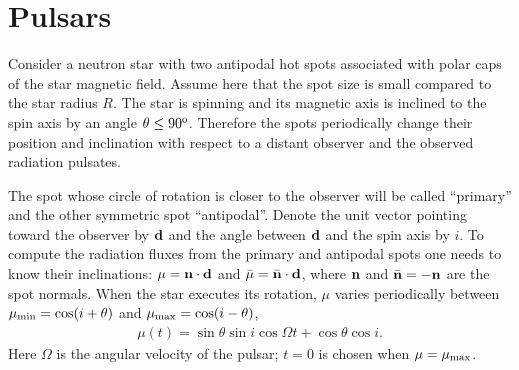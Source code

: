 \documentclass{article}
\def\om{{\it\bf a}}
\def\ob{{\it\bf d}}
\def\nn{{\it\bf n}}
\def\mumin{\mu_{\rm min}}
\def\mumax{\mu_{\rm max}}
\begin{document}
\newpage



\section{Pulsars}


Consider a neutron star with two antipodal hot spots associated with polar 
caps of the star magnetic field. Assume here that the spot size is small 
compared to the star radius $R$. The star is spinning and its magnetic axis 
is inclined to the spin axis by an angle $\theta\leq 90^{\rm o}$. Therefore 
the spots periodically change their position and inclination with respect to 
a distant observer and the observed radiation pulsates.

The spot whose circle of rotation is closer to the observer will be called
``primary'' and the other symmetric spot ``antipodal''.
Denote the unit vector pointing toward the observer by $\ob$ and the angle 
between $\ob$ and the spin axis by $i$. To compute the radiation 
fluxes from the primary and antipodal spots one needs to know their inclinations: 
$\mu=\nn\cdot\ob$ and $\bar{\mu}=\bar{\nn}\cdot\ob$, where $\nn$ and 
$\bar{\nn}=-\nn$ are the spot normals.
When the star executes its rotation, $\mu$ varies 
periodically between $\mumin=\cos(i+\theta)$ and $\mumax=\cos(i-\theta)$,
\begin{eqnarray}
  \mu(t)=\sin\theta\sin i\cos\Omega t+\cos\theta\cos i. 
\end{eqnarray}
Here $\Omega$ is the angular velocity of the pulsar; $t=0$ is chosen
when $\mu=\mumax$. 
\end{document}
